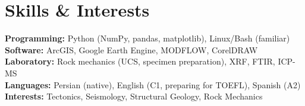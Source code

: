 \documentclass[11pt]{article}
\begin{document}
\section*{Skills \& Interests}
\textbf{Programming:} Python (NumPy, pandas, matplotlib), Linux/Bash (familiar)\\
\textbf{Software:} ArcGIS, Google Earth Engine, MODFLOW, CorelDRAW\\
\textbf{Laboratory:} Rock mechanics (UCS, specimen preparation), XRF, FTIR, ICP-MS\\
\textbf{Languages:} Persian (native), English (C1, preparing for TOEFL), Spanish (A2)\\
\textbf{Interests:} Tectonics, Seismology, Structural Geology, Rock Mechanics
\end{document}
